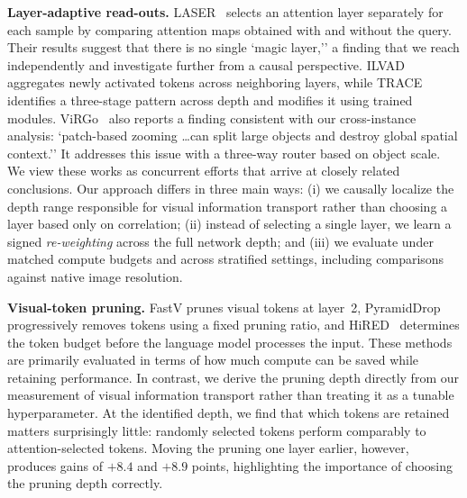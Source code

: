 \documentclass{article} %
\begin{document}
\textbf{Layer-adaptive read-outs.} LASER~\citep{laser} selects an attention layer separately for each sample by comparing attention maps obtained with and without the query. Their results suggest that there is no single `magic layer,'' a finding that we reach independently and investigate further from a causal perspective. ILVAD~\citep{ilvad} aggregates newly activated tokens across neighboring layers, while TRACE~\citep{trace} identifies a three-stage pattern across depth and modifies it using trained modules. ViRGo~\citep{virgo} also reports a finding consistent with our cross-instance analysis: `patch-based zooming \ldots can split large objects and destroy global spatial context.'' It addresses this issue with a three-way router based on object scale. We view these works as concurrent efforts that arrive at closely related conclusions. Our approach differs in three main ways: (i) we causally localize the depth range responsible for visual information transport rather than choosing a layer based only on correlation; (ii) instead of selecting a single layer, we learn a signed \emph{re-weighting} across the full network depth; and (iii) we evaluate under matched compute budgets and across stratified settings, including comparisons against native image resolution.


\textbf{Visual-token pruning.} FastV \citep{chen2024fastv} prunes visual tokens at layer~2, PyramidDrop~\citep{pyramiddrop} progressively removes tokens using a fixed pruning ratio, and HiRED~\citep{hired} determines the token budget before the language model processes the input. These methods are primarily evaluated in terms of how much compute can be saved while retaining performance. In contrast, we derive the pruning depth directly from our measurement of visual information transport rather than treating it as a tunable hyperparameter. At the identified depth, we find that which tokens are retained matters surprisingly little: randomly selected tokens perform comparably to attention-selected tokens. Moving the pruning one layer earlier, however, produces gains of $+8.4$ and $+8.9$ points, highlighting the importance of choosing the pruning depth correctly.
\end{document}
